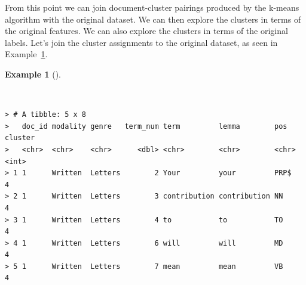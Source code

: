 \documentclass[
  letterpaper,
  DIV=11,
  numbers=noendperiod]{scrreport}
\newenvironment{Shaded}{\begin{snugshade}}{\end{snugshade}}
\newcommand{\AttributeTok}[1]{\textcolor[rgb]{0.00,0.00,0.00}{#1}}
\newcommand{\CommentTok}[1]{\textcolor[rgb]{0.00,0.00,0.00}{\textit{#1}}}
\newcommand{\DecValTok}[1]{\textcolor[rgb]{0.00,0.00,0.00}{#1}}
\newcommand{\FunctionTok}[1]{\textcolor[rgb]{0.00,0.00,0.00}{#1}}
\newcommand{\NormalTok}[1]{\textcolor[rgb]{0.00,0.00,0.00}{#1}}
\newcommand{\OtherTok}[1]{\textcolor[rgb]{0.00,0.00,0.00}{#1}}
\newcommand{\SpecialCharTok}[1]{\textcolor[rgb]{0.00,0.00,0.00}{#1}}
\newcommand{\StringTok}[1]{\textcolor[rgb]{0.00,0.00,0.00}{#1}}
\theoremstyle{definition}
\newtheorem{example}{Example}[chapter]
\theoremstyle{remark}
\begin{document}
From this point we can join document-cluster pairings produced by the
k-means algorithm with the original dataset. We can then explore the
clusters in terms of the original features. We can also explore the
clusters in terms of the original labels. Let's join the cluster
assignments to the original dataset, as seen in
Example~\ref{exm-eda-masc-pos-kmeans-join}.

\begin{example}[]\protect\hypertarget{exm-eda-masc-pos-kmeans-join}{}\label{exm-eda-masc-pos-kmeans-join}

~

\begin{Shaded}
\end{Shaded}

\begin{verbatim}
> # A tibble: 5 x 8
>   doc_id modality genre   term_num term         lemma        pos   cluster
>   <chr>  <chr>    <chr>      <dbl> <chr>        <chr>        <chr>   <int>
> 1 1      Written  Letters        2 Your         your         PRP$        4
> 2 1      Written  Letters        3 contribution contribution NN          4
> 3 1      Written  Letters        4 to           to           TO          4
> 4 1      Written  Letters        6 will         will         MD          4
> 5 1      Written  Letters        7 mean         mean         VB          4
\end{verbatim}

\end{example}
\end{document}
